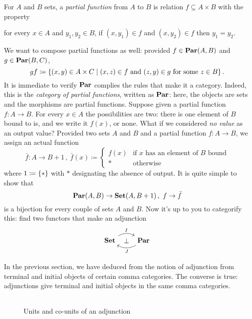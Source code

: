 \begin{exercise}
  For \(A\) and \(B\) sets, a {\em partial function} from \(A\) to
  \(B\) is relation \(f \subseteq A \times B\) with the property
  \begin{center}
    for every \(x \in A\) and \(y_1, y_2 \in B\), if
    \((x, y_1) \in f\) and \((x, y_2) \in f\) then \(y_1 = y_2\).
  \end{center}
  We want to compose partial functions as well: provided
  \(f \in \mathbf{Par}(A, B)\) and \(g \in \mathbf{Par}(B, C)\),
  \[gf \coloneq \left\{(x, y) \in A \times C \mid (x, z) \in f \text{ and } (z, y) \in g
      \text{ for some } z \in B\right\} .\] It is immediate to verify
  \(\mathbf{Par}\) complies the rules that make it a category. Indeed, this is
  the {\em category of partial functions}, written as \(\mathbf{Par}\): here,
  the objects are sets and the morphisms are partial functions.\newline
  Suppose given a partial function \(f : A \to B\). For every
  \(x \in A\) the possibilities are two: there is one element of \(B\)
  bound to is, and we write it \(f(x)\), or none. What if we
  considered {\em no value} as an output value?  Provided two sets
  \(A\) and \(B\) and a partial function \(f : A \to B\), we assign an
  actual function
  \[
    \bar f : A \to B+1 \,, \ \bar f(x) \coloneq
    \begin{cases} f(x) & \text{if \(x\) has an element of \(B\) bound}
      \\
      \ast & \text{otherwise}
    \end{cases}
  \]
  where \(1 \coloneq \left\{\ast\right\}\) with \(\ast\) designating the absence of
  output. It is quite simple to show that
  \[\mathbf{Par}(A,
    B) \to \mathbf{Set}(A, B+1)\,,\ f \to \bar f\] is a bijection for every couple
  of sets \(A\) and \(B\). Now it's up to you to categorify this: find
  two functors that make an adjunction
  \[\begin{tikzcd}
      \Set \ar["I"{name=I}, r, bend left] & \Par
      \ar["J"{name=J}, l, bend left] \ar["\perp"{description}, phantom,
      from=I, to=J]
    \end{tikzcd}\]
\end{exercise}

In the previous section, we have deduced from the notion of adjunction
from terminal and initial objects of certain comma categories. The
converse is true: adjunctions give terminal and initial objects in the
same comma categories.

\begin{figure}
  \centering
  \begin{tabular}{c}
     \\ 
    \midrule
    
  \end{tabular}
  \caption{Units and co-units of an adjunction}
\end{figure}

